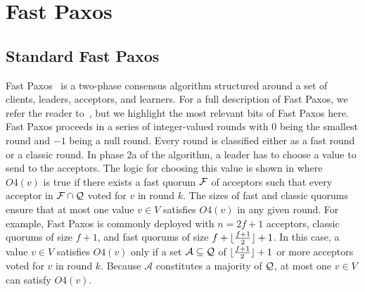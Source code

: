 \section{Fast Paxos}
\subsection{Standard Fast Paxos}
Fast Paxos~\cite{lamport2006fast} is a two-phase consensus algorithm structured
around a set of clients, leaders, acceptors, and learners. For a full
description of Fast Paxos, we refer the reader to~\cite{lamport2006fast}, but
we highlight the most relevant bits of Fast Paxos here. Fast Paxos proceeds in
a series of integer-valued rounds with $0$ being the smallest round and $-1$
being a null round. Every round is classified either as a fast round or a
classic round. In phase 2a of the algorithm, a leader has to choose a value to
send to the acceptors. The logic for choosing this value is shown in
 where $O4(v)$ is true if there exists a fast quorum
$\mathcal{F}$ of acceptors such that every acceptor in $\mathcal{F} \cap
\mathcal{Q}$ voted for $v$ in round $k$. The sizes of fast and classic quorums
ensure that at most one value $v \in V$ satisfies $O4(v)$ in any given round.
For example, Fast Paxos is commonly deployed with $n = 2f + 1$ acceptors,
classic quorums of size $f + 1$, and fast quorums of size $f + \lfloor\frac{f + 1}{2}\rfloor + 1$.
In this case, a value $v \in V$ satisfies $O4(v)$ only if a set $\mathcal{A}
\subseteq \mathcal{Q}$ of $\lfloor\frac{f + 1}{2}\rfloor + 1$ or more acceptors voted for $v$ in
round $k$. Because $\mathcal{A}$ constitutes a majority of $\mathcal{Q}$, at most
one $v \in V$ can satisfy $O4(v)$.

